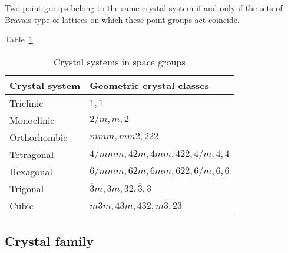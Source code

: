 \todo{}

Two point groups belong to the same crystal system if and only if the sets of Bravais type of lattices on which these point groups act coincide.

Table~\ref{tab:crystal_system}

\begin{table}[htb]
  \centering
  \caption{Crystal systems in space groups}
  \label{tab:crystal_system}
  \begin{tabular}{ll}
    \hline
    Crystal system & Geometric crystal classes                                \\ \hline
    Triclinic      & $1, \overline{1}$                                        \\
    Monoclinic     & $2/m, m, 2$                                              \\
    Orthorhombic   & $mmm, mm2, 222$                                          \\
    Tetragonal     & $4/mmm, \overline{4}2m, 4mm, 422, 4/m, \overline{4}, 4$  \\
    Hexagonal      & $6/mmm, \overline{6}2m, 6mm, 622, 6/m, \overline{6}, 6$  \\
    Trigonal       & $\overline{3}m, 3m, 32, \overline{3}, 3$                 \\
    Cubic          & $m\overline{3}m, \overline{4}3m, 432, m\overline{3}, 23$ \\ \hline
  \end{tabular}
\end{table}

\subsection{\label{sec:crystal-family}Crystal family}
